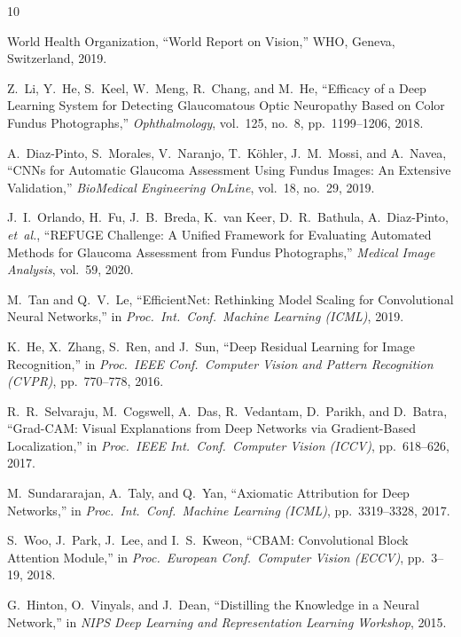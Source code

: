 \documentclass[conference]{IEEEtran}
\begin{document}
\balance
\begin{thebibliography}{10}

World Health Organization, ``World Report on Vision,'' WHO, Geneva, Switzerland, 2019.

Z.~Li, Y.~He, S.~Keel, W.~Meng, R.~Chang, and M.~He, ``Efficacy of a Deep Learning System for Detecting Glaucomatous Optic Neuropathy Based on Color Fundus Photographs,'' \textit{Ophthalmology}, vol.~125, no.~8, pp.~1199--1206, 2018.

A.~Diaz-Pinto, S.~Morales, V.~Naranjo, T.~K{\"o}hler, J.~M.~Mossi, and A.~Navea, ``CNNs for Automatic Glaucoma Assessment Using Fundus Images: An Extensive Validation,'' \textit{BioMedical Engineering OnLine}, vol.~18, no.~29, 2019.

J.~I.~Orlando, H.~Fu, J.~B.~Breda, K.~van Keer, D.~R.~Bathula, A.~Diaz-Pinto, \textit{et~al.}, ``REFUGE Challenge: A Unified Framework for Evaluating Automated Methods for Glaucoma Assessment from Fundus Photographs,'' \textit{Medical Image Analysis}, vol.~59, 2020.

M.~Tan and Q.~V.~Le, ``EfficientNet: Rethinking Model Scaling for Convolutional Neural Networks,'' in \textit{Proc.\ Int.\ Conf.\ Machine Learning (ICML)}, 2019.

K.~He, X.~Zhang, S.~Ren, and J.~Sun, ``Deep Residual Learning for Image Recognition,'' in \textit{Proc.\ IEEE Conf.\ Computer Vision and Pattern Recognition (CVPR)}, pp.~770--778, 2016.

R.~R.~Selvaraju, M.~Cogswell, A.~Das, R.~Vedantam, D.~Parikh, and D.~Batra, ``Grad-CAM: Visual Explanations from Deep Networks via Gradient-Based Localization,'' in \textit{Proc.\ IEEE Int.\ Conf.\ Computer Vision (ICCV)}, pp.~618--626, 2017.

M.~Sundararajan, A.~Taly, and Q.~Yan, ``Axiomatic Attribution for Deep Networks,'' in \textit{Proc.\ Int.\ Conf.\ Machine Learning (ICML)}, pp.~3319--3328, 2017.

S.~Woo, J.~Park, J.~Lee, and I.~S.~Kweon, ``CBAM: Convolutional Block Attention Module,'' in \textit{Proc.\ European Conf.\ Computer Vision (ECCV)}, pp.~3--19, 2018.

G.~Hinton, O.~Vinyals, and J.~Dean, ``Distilling the Knowledge in a Neural Network,'' in \textit{NIPS Deep Learning and Representation Learning Workshop}, 2015.

\end{thebibliography}
\end{document}
